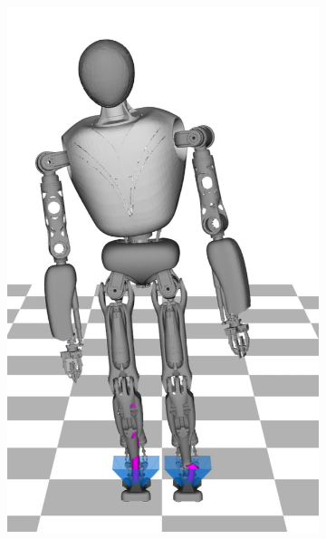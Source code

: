 \begin{figure}
\begin{subfigure}{.16\textwidth}
	\includegraphics[width=.95\linewidth]{fig/walkStatic/snaps/8}
	\caption{}
\end{subfigure}%
\begin{subfigure}{.16\textwidth}

\end{subfigure}
\end{figure}
